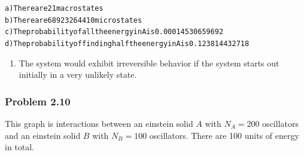 \documentclass[letterpaper,10pt,english]{/usr/local/lib/python2.7/dist-packages/sphinx/texinputs/sphinxhowto}
\newenvironment{InvisibleVerbatim}
        {\begin{mdframed}[leftmargin=0.1\linewidth,innerleftmargin=3pt,innerrightmargin=3pt, userdefinedwidth=1\linewidth, linewidth=0pt, linecolor=white, usetwoside=false]}
        {\end{mdframed}}
\begin{document}
    

        
        

            
                \begin{InvisibleVerbatim}
                \vspace{-0.5\baselineskip}
\begin{alltt}a) There are 21 macrostates
b) There are 68923264410 microstates
c) The probability of all the energy in A is 0.00014530659692
d) The probability of finding half the energy in A is 0.123814432718
\end{alltt}

            \end{InvisibleVerbatim}
            
        
    
\begin{enumerate}
\def\labelenumi{\alph{enumi})}
\setcounter{enumi}{4}
\itemsep1pt\parskip0pt
\item
  The system would exhibit irreversible behavior if the system starts
  out initially in a very unlikely state.
\end{enumerate}\subsubsection{Problem 2.10}This graph is interactions between an einstein solid \(A\) with
\(N_A = 200\) oscillators and an einstein solid \(B\) with \(N_B = 100\)
oscillators. There are 100 units of energy in total.

\end{document}
